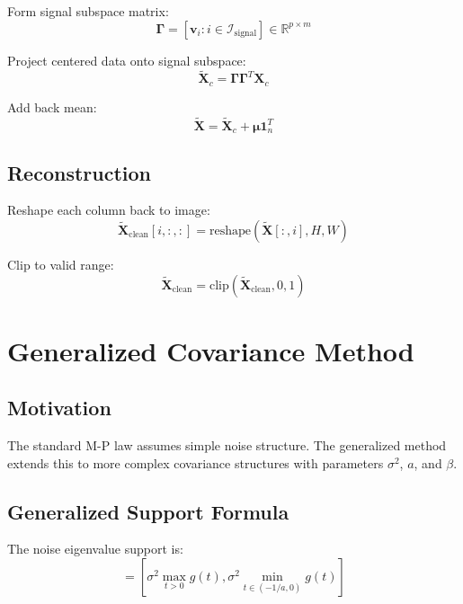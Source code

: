 \documentclass[12pt,a4paper]{article}
\begin{document}
Form signal subspace matrix:
\begin{equation}
\mathbf{\Gamma} = [\mathbf{v}_i : i \in \mathcal{I}_{\text{signal}}] \in \mathbb{R}^{p \times m}
\end{equation}

Project centered data onto signal subspace:
\begin{equation}
\tilde{\mathbf{X}}_c = \mathbf{\Gamma}\mathbf{\Gamma}^T \mathbf{X}_c
\end{equation}

Add back mean:
\begin{equation}
\tilde{\mathbf{X}} = \tilde{\mathbf{X}}_c + \boldsymbol{\mu}\mathbf{1}_n^T
\end{equation}

\subsection{Reconstruction}

Reshape each column back to image:
\begin{equation}
\tilde{\mathbf{X}}_{\text{clean}}[i,:,:] = \text{reshape}(\tilde{\mathbf{X}}[:,i], H, W)
\end{equation}

Clip to valid range:
\begin{equation}
\tilde{\mathbf{X}}_{\text{clean}} = \text{clip}(\tilde{\mathbf{X}}_{\text{clean}}, 0, 1)
\end{equation}

\section{Generalized Covariance Method}

\subsection{Motivation}

The standard M-P law assumes simple noise structure. The generalized method extends this to more complex covariance structures with parameters $\sigma^2$, $a$, and $\beta$.

\subsection{Generalized Support Formula}

The noise eigenvalue support is:
\begin{equation}
[\lambda_+^{\text{gen}}, \lambda_-^{\text{gen}}] = \left[\sigma^2 \max_{t>0} g(t), \sigma^2 \min_{t \in (-1/a, 0)} g(t)\right]
\end{equation}
\end{document}
